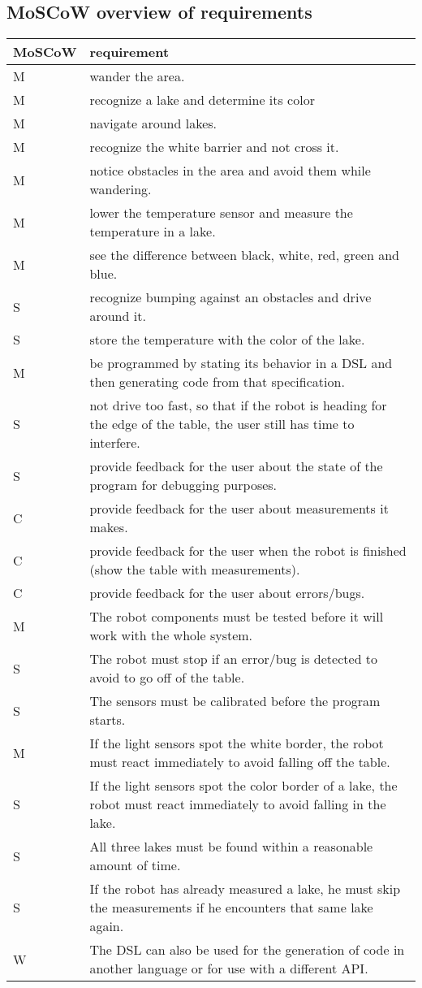 \documentclass[10pt,a4paper]{article}
\begin{document}
\subsection*{MoSCoW overview of requirements}
\begin{tabular}{|p{3cm}|p{12cm}|} 
\hline
MoSCoW & requirement\\
\hline
M & wander the area.\\
M & recognize a lake and determine its color\\
M & navigate around lakes.\\
M & recognize the white barrier and not cross it.\\
M & notice obstacles in the area and avoid them while wandering.\\
M & lower the temperature sensor and measure the temperature in a lake.\\
M & see the difference between black, white, red, green and blue.\\
S & recognize bumping against an obstacles and drive around it.\\
S & store the temperature with the color of the lake.\\
\hline
M & be programmed by stating its behavior in a DSL and then generating code from that specification.\\
S & not drive too fast, so that if the robot is heading for the edge of the table, the user still has time to interfere.\\
S & provide feedback for the user about the state of the program for debugging purposes.\\
C & provide feedback for the user about measurements it makes.\\
C & provide feedback for the user when the robot is finished (show the table with measurements).\\
C & provide feedback for the user about errors/bugs.\\
\hline
M & The robot components must be tested before it will work with the whole system.\\
S & The robot must stop if an error/bug is detected to avoid to go off of the table. \\
S & The sensors must be calibrated before the program starts.\\
\hline
M & If the light sensors spot the white border, the robot must react immediately to avoid falling off the table.\\
S & If the light sensors spot the color border of a lake, the robot must react immediately to avoid falling in the lake.\\
S & All three lakes must be found within a reasonable amount of time.\\
S & If the robot has already measured a lake, he must skip the measurements if he encounters that same lake again.\\
\hline
W & The DSL can also be used for the generation of code in another language or for use with a different API.\\
\hline
\end{tabular}
\end{document}
